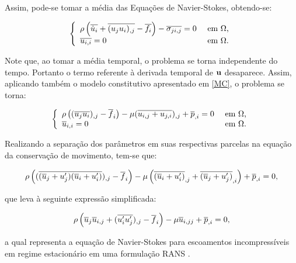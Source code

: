 \documentclass[_ArquivoPrincipal.tex]{subfiles}
\begin{document}
Assim, pode-se tomar a média das Equações de Navier-Stokes, obtendo-se:

\begin{equation}
    \left\{
    \begin{array}{ll}
        \rho\left({\overline{\dot{u}_i}+\overline{(u_ju_i)_{,j}}-\overline{f_i}}\right)-\overline{\sigma_{ji,j}}=0 & \text{ em }\Omega\text{,} \\
        \overline{u_{i,i}}=0                                                                  & \text{ em }\Omega\text{.}
    \end{array}
    \right.
\end{equation}

Note que, ao tomar a média temporal, o problema se torna independente do tempo. Portanto o termo referente à derivada temporal de $\mathbf{u}$ desaparece. Assim, aplicando também o modelo constitutivo apresentado em \ref{MC}, o problema se torna:

\begin{equation}
    \left\{
    \begin{array}{ll}
        \rho\left({(\overline{u_ju_i})_{,j}-\overline{f}_i}\right)-\mu(\overline{u_{i,j}+u_{j,i}})_{,j}+\overline{p}_{,i}=0 & \text{ em }\Omega\text{,} \\
        \overline{u}_{i,i}=0                                                                           & \text{ em }\Omega\text{.}
    \end{array}
    \right.
\end{equation}

Realizando a separação dos parâmetros em suas respectivas parcelas na equação da conservação de movimento, tem-se que:

\begin{equation}
    \rho\left({(\overline{(\overline{u}_j+u'_j)(\overline{u}_i+u'_i)})_{,j}-\overline{f}_i}\right)-\mu\left({\overline{(\overline{u}_i+u'_i)}_{,j}+\overline{(\overline{u}_j+u'_j)}_{,i}}\right)+\overline{p}_{,i}=0\text{,}
\end{equation}

\noindent que leva à seguinte expressão simplificada:

\begin{equation}
    \rho\left({\overline{u}_j\overline{u}_{i,j}+(\overline{u'_iu'_j})_{,j}-\overline{f}_i}\right)-\mu\overline{u}_{i,jj}+\overline{p}_{,i}=0\text{,}
    \label{eq:RANS-estac}
\end{equation}

\noindent a qual representa a equação de Navier-Stokes para escoamentos incompressíveis em regime estacionário em uma formulação RANS \cite{chou1945velocity,alfonsi2009reynolds}.
\end{document}
